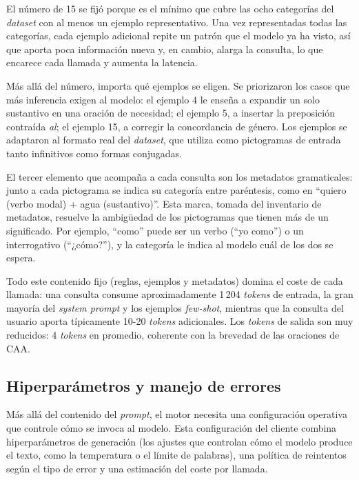 El número de 15 se fijó porque es el mínimo que cubre las ocho categorías del \textit{dataset} con al menos un ejemplo representativo. Una vez representadas todas las categorías, cada ejemplo adicional repite un patrón que el modelo ya ha visto, así que aporta poca información nueva y, en cambio, alarga la consulta, lo que encarece cada llamada y aumenta la latencia.

Más allá del número, importa qué ejemplos se eligen. Se priorizaron los casos que más inferencia exigen al modelo: el ejemplo 4 le enseña a expandir un solo sustantivo en una oración de necesidad; el ejemplo 5, a insertar la preposición contraída \textit{al}; el ejemplo 15, a corregir la concordancia de género. Los ejemplos se adaptaron al formato real del \textit{dataset}, que utiliza como pictogramas de entrada tanto infinitivos como formas conjugadas.


El tercer elemento que acompaña a cada consulta son los metadatos gramaticales: junto a cada pictograma se indica su categoría entre paréntesis, como en ``quiero (verbo modal) + agua (sustantivo)''. Esta marca, tomada del inventario de metadatos, resuelve la ambigüedad de los pictogramas que tienen más de un significado. Por ejemplo, ``como'' puede ser un verbo (``yo como'') o un interrogativo (``¿cómo?''), y la categoría le indica al modelo cuál de los dos se espera.

Todo este contenido fijo (reglas, ejemplos y metadatos) domina el coste de cada llamada: una consulta consume aproximadamente 1\,204 \textit{tokens} de entrada, la gran mayoría del \textit{system prompt} y los ejemplos \textit{few-shot}, mientras que la consulta del usuario aporta típicamente 10-20 \textit{tokens} adicionales. Los \textit{tokens} de salida son muy reducidos: 4 \textit{tokens} en promedio, coherente con la brevedad de las oraciones de CAA.

\subsection{Hiperparámetros y manejo de errores}
\label{sec:f3-hiperparametros}

Más allá del contenido del \textit{prompt}, el motor necesita una configuración operativa que controle cómo se invoca al modelo. Esta configuración del cliente combina hiperparámetros de generación (los ajustes que controlan cómo el modelo produce el texto, como la temperatura o el límite de palabras), una política de reintentos según el tipo de error y una estimación del coste por llamada.

